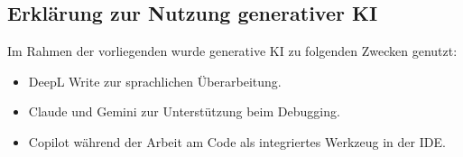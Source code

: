 \begin{otherlanguage}{ngerman}

\section*{Erklärung zur Nutzung generativer KI}

Im Rahmen der vorliegenden \thesistypegerman{} wurde generative KI zu folgenden Zwecken genutzt:


\begin{itemize}
 \item DeepL Write zur sprachlichen Überarbeitung.
 \item Claude und Gemini zur Unterstützung beim Debugging.
 \item Copilot während der Arbeit am Code als integriertes Werkzeug in der IDE.
\end{itemize}


\end{otherlanguage}

